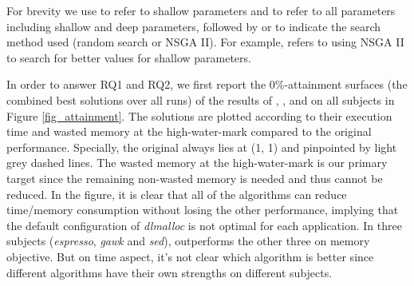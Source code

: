 For brevity we use \emph{\shallow} to refer to shallow parameters and \emph{\all} to refer to all parameters including shallow and deep parameters, followed by \emph{\randomsearch} or \emph{\nsgaii} to indicate the search method used (random search or NSGA II). For example, \sn{} refers to using NSGA II to search for better values for shallow parameters.

\begin{figure*}[htb]
	\centering
	\subfigure[espresso]{
		\label{fig_attainment_espresso}
		\texttt{[image: espresso\_attainment\_best]}%
	}
	\subfigure[gawk]{
		\label{fig_attainment_gawk}
		\texttt{[image: gawk\_attainment\_best]}%
	}
	\subfigure[flex]{
		\label{fig_attainment_flex}
		\texttt{[image: flex\_attainment\_best]}%
	}
	\subfigure[sed]{
		\label{fig_attainment_sed}
		\texttt{[image: sed\_attainment\_best]}%
	}
	\caption{0\%, 50\%, 100\%-attainment surfaces of the results of \sr{}, \sn{}, \dr{}, \dn{} over 20 runs for each application.}\label{fig_attainment}
\end{figure*}

In order to answer RQ1 and RQ2, we first report the 0\%-attainment surfaces (the combined best solutions over all runs) of the results of \sr{}, \sn{}, \dr{} and \dn{} on all subjects in Figure \ref{fig_attainment}. The solutions are plotted according to their execution time and wasted memory at the high-water-mark compared to the original performance. Specially, the original always lies at (1, 1) and pinpointed by light grey dashed lines. The wasted memory at the high-water-mark is our primary target since the remaining non-wasted memory is needed and thus cannot be reduced. 
In the figure, it is clear that all of the algorithms can reduce time/memory consumption without losing the other performance, implying that the default configuration of \emph{dlmalloc} is not optimal for each application. In three subjects (\emph{espresso}, \emph{gawk} and \emph{sed}), \dn{} outperforms the other three on memory objective. But on time aspect, it's not clear which algorithm is better since different algorithms have their own strengths on different subjects. 

